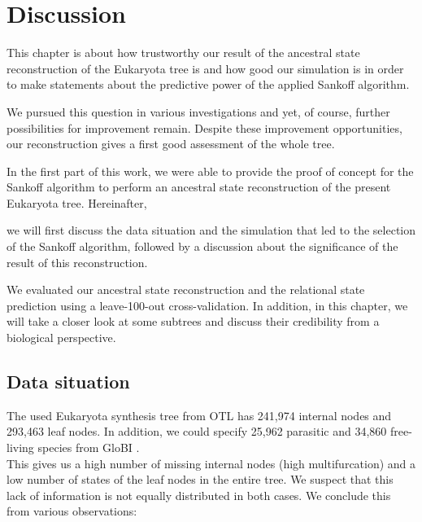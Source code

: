 \chapter{Discussion}
  This chapter is about how trustworthy our result of the ancestral state reconstruction of the 
    Eukaryota tree is and how good our simulation is in order to make statements about the predictive 
    power of the applied Sankoff algorithm.

  We pursued this question in various investigations and yet, of course, further possibilities for 
    improvement remain. Despite these improvement opportunities, our reconstruction gives a first 
    good assessment of the whole tree.

  In the first part of this work, we were able to provide the proof of concept for the Sankoff 
    algorithm to perform an ancestral state reconstruction of the present Eukaryota tree. Hereinafter, 
    
    we will first discuss the data situation and the simulation that led to the selection of the 
    Sankoff algorithm, followed by a discussion about the significance of the result of this 
    reconstruction.

  We evaluated our ancestral state reconstruction and the relational state prediction using a 
    leave-100-out cross-validation. In addition, in this chapter, we will take a closer look at some 
    subtrees and discuss their credibility from a biological perspective.

  \section{Data situation}
    The used Eukaryota synthesis tree from OTL \cite{Hinchliff2015} has 241,974 internal nodes and 
      293,463 leaf nodes. In addition, we could specify 25,962 parasitic and 34,860 free-living 
      species from GloBI \cite{Poelen2014}. \\
    This gives us a high number of missing internal nodes (high multifurcation) and a low number of 
      states of the leaf nodes in the entire tree.
    We suspect that this lack of information is not equally distributed in both cases. We conclude 
      this from various observations:

